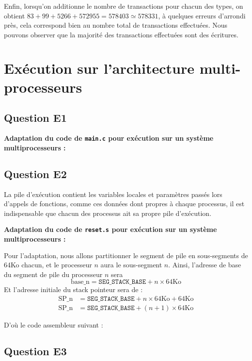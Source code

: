 \documentclass{article}
\begin{document}
Enfin, lorsqu'on additionne le nombre de transactions pour chacun des types, on obtient $83 + 99 + 5266 + 572955 = 578403 \simeq 578331$, à quelques erreurs d'arrondi près, cela correspond bien au nombre total de transactions effectuées. Nous pouvons observer que la majorité des transactions effectuées sont des écritures.

\section{Exécution sur l'architecture multi-processeurs}

\subsection{Question E1}

\textbf{Adaptation du code de \texttt{main.c} pour exécution sur un système multiprocesseurs :}


\subsection{Question E2}

La pile d'exécution contient les variables locales et paramètres passés lors d'appels de fonctions, comme ces données dont propres à chaque processus, il est indispensable que chacun des processus ait sa propre pile d'exécution.

\textbf{Adaptation du code de \texttt{reset.s} pour exécution sur un système multiprocesseurs :}

Pour l'adaptation, nous allons partitionner le segment de pile en sous-segments de 64Ko chacun,
et le processeur $n$ aura le sous-segment $n$.
Ainsi, l'adresse de base du segment de pile du processeur $n$ sera
\[ \text{base\_n} = \texttt{SEG\_STACK\_BASE} + n \times 64\text{Ko} \]
Et l'adresse initiale du stack pointeur sera de :
\begin{align*}
  \text{SP\_n} &= \texttt{SEG\_STACK\_BASE} + n \times 64\text{Ko} + 64\text{Ko} \\
  \text{SP\_n} &= \texttt{SEG\_STACK\_BASE} + (n + 1) \times 64\text{Ko}
\end{align*}

D'où le code assembleur suivant :



\subsection{Question E3}
\end{document}
